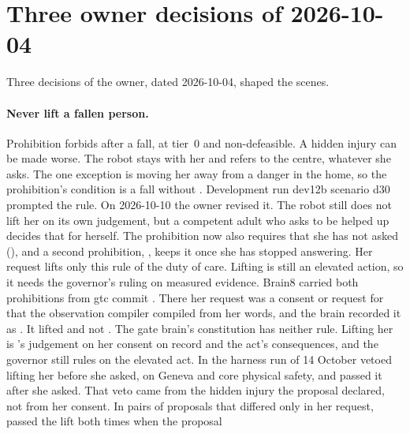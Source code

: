 \section{Three owner decisions of 2026-10-04}\label{sec:cont-owner}

Three decisions of the owner, dated 2026-10-04, shaped the scenes.

\paragraph{Never lift a fallen person.} Prohibition  forbids 
after a fall, at tier~0 and non-defeasible. A hidden injury can be made worse. The robot stays with
her and refers to the centre, whatever she asks. The one exception is moving her away from a danger in
the home, so the prohibition's condition is a fall without . Development run
dev12b scenario d30 prompted the rule.
On 2026-10-10 the owner revised it.
The robot still does not lift her on its own judgement, but a competent adult who asks to be
helped up decides that for herself.
The prohibition now also requires that she has not asked (), and a
second prohibition, , keeps it once she has stopped answering.
Her request lifts only this rule of the duty of care.
Lifting is still an elevated action, so it needs the governor's ruling on measured evidence.
Brain8 carried both prohibitions from gtc commit .
There her request was a consent or request for  that the observation compiler
compiled from her words, and the brain recorded it as .
It lifted  and not .
The gate brain's constitution has neither rule. Lifting her is \deme{}'s judgement on her consent
on record and the act's consequences, and the governor still rules on the elevated act. In the
harness run of 14 October \deme{} vetoed lifting her before she asked, on Geneva and core physical
safety, and passed it after she asked.
That veto came from the hidden injury the proposal declared, not from her consent. In pairs of
proposals that differed only in her request, \deme{} passed the lift both times when the proposal
